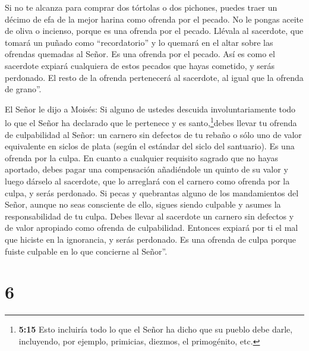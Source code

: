 Si no te alcanza para comprar dos tórtolas o dos pichones,
puedes traer un décimo de efa de la mejor harina como ofrenda por el
pecado. No le pongas aceite de oliva o incienso, porque es una ofrenda
por el pecado.  Llévala al sacerdote, que tomará un puñado
como ``recordatorio'' y lo quemará en el altar sobre las ofrendas
quemadas al Señor. Es una ofrenda por el pecado.  Así es
como el sacerdote expiará cualquiera de estos pecados que hayas
cometido, y serás perdonado. El resto de la ofrenda pertenecerá al
sacerdote, al igual que la ofrenda de grano''.

 El Señor le dijo a Moisés:  Si alguno de
ustedes descuida involuntariamente todo lo que el Señor ha declarado que
le pertenece y es santo,\footnote{\textbf{5:15} Esto incluiría todo lo
  que el Señor ha dicho que su pueblo debe darle, incluyendo, por
  ejemplo, primicias, diezmos, el primogénito, etc.}debes llevar tu
ofrenda de culpabilidad al Señor: un carnero sin defectos de tu rebaño o
sólo uno de valor equivalente en siclos de plata (según el estándar del
siclo del santuario). Es una ofrenda por la culpa.  En
cuanto a cualquier requisito sagrado que no hayas aportado, debes pagar
una compensación añadiéndole un quinto de su valor y luego dárselo al
sacerdote, que lo arreglará con el carnero como ofrenda por la culpa, y
serás perdonado.  Si pecas y quebrantas alguno de los
mandamientos del Señor, aunque no seas consciente de ello, sigues siendo
culpable y asumes la responsabilidad de tu culpa.  Debes
llevar al sacerdote un carnero sin defectos y de valor apropiado como
ofrenda de culpabilidad. Entonces expiará por ti el mal que hiciste en
la ignorancia, y serás perdonado.  Es una ofrenda de culpa
porque fuiste culpable en lo que concierne al Señor''.

\hypertarget{section-5}{%
\section{6}\label{section-5}}

